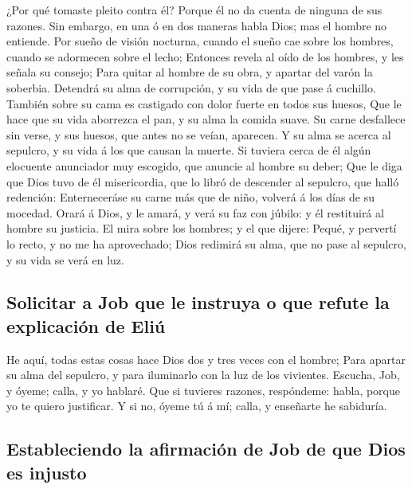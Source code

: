  ¿Por qué tomaste pleito contra él? Porque él no da
cuenta de ninguna de sus razones.  Sin embargo, en una ó
en dos maneras habla Dios; mas el hombre no entiende. 
Por sueño de visión nocturna, cuando el sueño cae sobre los hombres,
cuando se adormecen sobre el lecho;  Entonces revela al
oído de los hombres, y les señala su consejo;  Para
quitar al hombre de su obra, y apartar del varón la soberbia.
 Detendrá su alma de corrupción, y su vida de que pase á
cuchillo.  También sobre su cama es castigado con dolor
fuerte en todos sus huesos,  Que le hace que su vida
aborrezca el pan, y su alma la comida suave.  Su carne
desfallece sin verse, y sus huesos, que antes no se veían, aparecen.
 Y su alma se acerca al sepulcro, y su vida á los que
causan la muerte.  Si tuviera cerca de él algún elocuente
anunciador muy escogido, que anuncie al hombre su deber; 
Que le diga que Dios tuvo de él misericordia, que lo libró de descender
al sepulcro, que halló redención:  Enterneceráse su carne
más que de niño, volverá á los días de su mocedad.  Orará
á Dios, y le amará, y verá su faz con júbilo: y él restituirá al hombre
su justicia.  El mira sobre los hombres; y el que dijere:
Pequé, y pervertí lo recto, y no me ha aprovechado;  Dios
redimirá su alma, que no pase al sepulcro, y su vida se verá en luz.

\hypertarget{solicitar-a-job-que-le-instruya-o-que-refute-la-explicaciuxf3n-de-eliuxfa}{%
\subsection{Solicitar a Job que le instruya o que refute la explicación
de
Eliú}\label{solicitar-a-job-que-le-instruya-o-que-refute-la-explicaciuxf3n-de-eliuxfa}}

 He aquí, todas estas cosas hace Dios dos y tres veces
con el hombre;  Para apartar su alma del sepulcro, y para
iluminarlo con la luz de los vivientes.  Escucha, Job, y
óyeme; calla, y yo hablaré.  Que si tuvieres razones,
respóndeme: habla, porque yo te quiero justificar.  Y si
no, óyeme tú á mí; calla, y enseñarte he sabiduría.

\hypertarget{estableciendo-la-afirmaciuxf3n-de-job-de-que-dios-es-injusto}{%
\subsection{Estableciendo la afirmación de Job de que Dios es
injusto}\label{estableciendo-la-afirmaciuxf3n-de-job-de-que-dios-es-injusto}}

